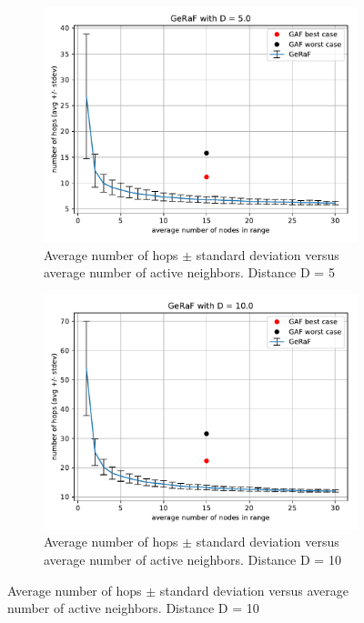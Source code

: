 \documentclass[11pt,a4paper]{article}
\begin{document}
\begin{figure}[ht]
\centering
\begin{subfigure}{.45\textwidth}
  \centering
  \includegraphics[width=\linewidth]{hops_montecarlo_D=5.pdf}
  \caption{Average number of hops $\pm$ standard deviation versus average number of active neighbors. Distance D = 5}
  \label{fig:hops5}
\end{subfigure}%
\hspace{0.5cm}
\begin{subfigure}{.45\textwidth}
  \centering
  \includegraphics[width=\linewidth]{hops_montecarlo_D=10.pdf}
  \caption{Average number of hops $\pm$ standard deviation versus average number of active neighbors. Distance D = 10}

\end{subfigure}
\end{figure}
\end{document}
